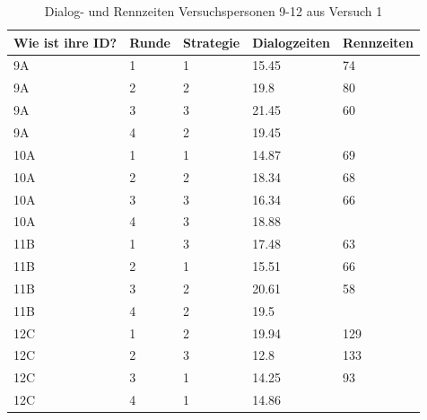 \documentclass[12pt,a4paper]{scrartcl}
\begin{document}
\begin{appendix}
\begin{table}
\begin{tabular}{ | l | l | l | l | l | }
\end{tabular}

\end{table}

\begin{table}
\centering
\caption{Dialog- und Rennzeiten Versuchspersonen 9-12 aus Versuch 1}
\begin{tabular}{ | l | l | l | l | l | }
\hline
	Wie ist ihre ID? & Runde & Strategie & Dialogzeiten & Rennzeiten \\ \hline \hline
	9A & 1 & 1 & 15.45 & 74 \\ \hline
	9A & 2 & 2 & 19.8 & 80 \\ \hline
	9A & 3 & 3 & 21.45 & 60 \\ \hline
	9A & 4 & 2 & 19.45 &  \\ \hline \hline
	10A & 1 & 1 & 14.87 & 69 \\ \hline
	10A & 2 & 2 & 18.34 & 68 \\ \hline
	10A & 3 & 3 & 16.34 & 66 \\ \hline
	10A & 4 & 3 & 18.88 &  \\ \hline \hline
	11B & 1 & 3 & 17.48 & 63 \\ \hline
	11B & 2 & 1 & 15.51 & 66 \\ \hline
	11B & 3 & 2 & 20.61 & 58 \\ \hline
	11B & 4 & 2 & 19.5 &  \\ \hline \hline
	12C & 1 & 2 & 19.94 & 129 \\ \hline
	12C & 2 & 3 & 12.8 & 133 \\ \hline
	12C & 3 & 1 & 14.25 & 93 \\ \hline
	12C & 4 & 1 & 14.86 &  \\ \hline

\end{tabular}

\end{table}



\end{appendix}
\end{document}
